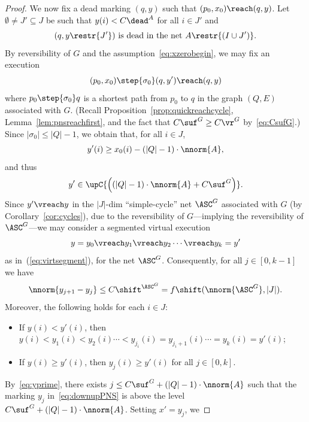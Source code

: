 \begin{proof}
	We now fix a dead marking $(q,y)$ such that $(p_0,x_0)\reach
	(q,y)$. 
Let $\emptyset\neq J'\subseteq J$ be such that 
	$y(i)< C\dead^A$ for all $i\in J'$ and 
	\begin{equation}\label{eq:Jprime}
		\textnormal{$(q,y\restr{J'})$ is
		dead in the net $A\restr{(I\cup J')}$.}
	\end{equation}
	By reversibility of $G$ and the
	assumption~\eqref{eq:xzerobegin},
 we may fix an
	execution 
\begin{equation*}
(p_0,x_0)\step{\sigma_0}(q,y')\reach (q,y)
\end{equation*}
where  $p_0\step{\sigma_0}q$ is a shortest path from $p_0$ to $q$ in the
	graph $(Q,E)$ associated with $G$. 
	(Recall Proposition~\ref{prop:quickreachcycle},
	Lemma~\ref{lem:pnsreachfirst}, and the fact that $C\suf^G\geq
	C\vr^G$ by~\eqref{eq:CsufG}.)
Since $|\sigma_0|\leq |Q|-1$, we obtain that, for all $i\in J$,
	\begin{equation}\label{eq:yprimefirst}
		y'(i)\geq x_0(i)-(|Q|-1)\cdot\nnorm{A},
	\end{equation}
and thus
	\begin{equation}\label{eq:yprime}
		y'\in\upC{\left((|Q|-1)\cdot\nnorm{A}+C\suf^G\right)}.
	\end{equation}
Since $y'\vreach y$ in the
	$|J|$-dim ``simple-cycle'' net $\ASC^G$ associated with $G$
	(by Corollary~\ref{cor:cycles}), 
due to the reversibility of $G$---implying the reversibility of
	$\ASC^G$---we may consider a segmented
 virtual execution  
	\begin{equation}\label{eq:downupPNS}
y=y_0\vreach y_1\vreach y_2\cdots\vreach y_k=y'
	\end{equation}
	as in~(\ref{eq:virtsegment}), for the net $\ASC^G$.	
	Consequently, for all $j\in[0,k-1]$ we have
	\begin{equation}\label{eq:CshiftASC}
	\nnorm{y_{j+1}-y_j}\leq
		C\shift^{\ASC^G}=f\shift(\nnorm{\ASC^G},|J|).
\end{equation}
Moreover, 
 the following holds for each $i\in J$:
\begin{itemize}
\item If $y(i)<y'(i)$, then
	$y(i)<y_1(i)<y_2(i)\cdots <y_{j_i}(i)=y_{j_i+1}(i)\cdots
	=y_k(i)=y'(i)$;
\item	
If $y(i)\geq y'(i)$, then $y_j(i)\geq y'(i)$ for all
	$j\in[0,k]$.
	\end{itemize}
By~\eqref{eq:yprime}, 
	there exists $j\leq C\suf^G+(|Q|-1)\cdot\nnorm{A}$ such that 
	the marking $y_j$ in~\eqref{eq:downupPNS}
	is above the level $C\suf^G+(|Q|-1)\cdot\nnorm{A}$. Setting $x'=y_j$, we

\end{proof}
